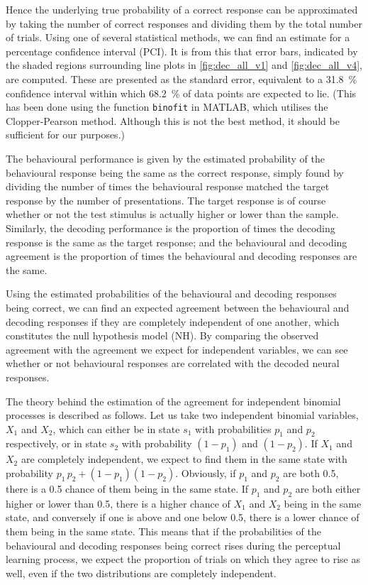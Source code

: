 Hence the underlying true probability of a correct response can be approximated by taking the number of correct responses and dividing them by the total number of trials.
Using one of several statistical methods, we can find an estimate for a percentage confidence interval (PCI).
It is from this that error bars, indicated by the shaded regions surrounding line plots in \autoref{fig:dec_all_v1} and \autoref{fig:dec_all_v4}, are computed.
These are presented as the standard error, equivalent to a \SI{31.8}{\percent}  confidence interval within which \SI{68.2}{\percent} of data points are expected to lie.
(This has been done using the function \texttt{binofit} in MATLAB, which utilises the Clopper-Pearson method.
Although this is not the best method, it should be sufficient for our purposes.)

The behavioural performance is given by the estimated probability of the behavioural response being the same as the correct response, simply found by dividing the number of times the behavioural response matched the target response by the number of presentations.
The target response is of course whether or not the test stimulus is actually higher or lower than the sample.
Similarly, the decoding performance is the proportion of times the decoding response is the same as the target response; and the behavioural and decoding agreement is the proportion of times the behavioural and decoding responses are the same.

Using the estimated probabilities of the behavioural and decoding responses being correct, we can find an expected agreement between the behavioural and decoding responses if they are completely independent of one another, which constitutes the null hypothesis model (NH).
By comparing the observed agreement with the agreement we expect for independent variables, we can see whether or not behavioural responses are correlated with the decoded neural responses.

The theory behind the estimation of the agreement for independent binomial processes is described as follows.
Let us take two independent binomial variables, $X_1$ and $X_2$, which can either be in state $s_1$ with probabilities $p_1$ and $p_2$ respectively, or in state $s_2$ with probability $(1-p_1)$ and $(1-p_2)$.
If $X_1$ and $X_2$ are completely independent, we expect to find them in the same state with probability $p_1 \, p_2 + (1-p_1) (1-p_2)$.
Obviously, if $p_1$ and $p_2$ are both 0.5, there is a 0.5 chance of them being in the same state.
If $p_1$ and $p_2$ are both either higher or lower than 0.5, there is a higher chance of $X_1$ and $X_2$ being in the same state, and conversely if one is above and one below 0.5, there is a lower chance of them being in the same state.
This means that if the probabilities of the behavioural and decoding responses being correct rises during the perceptual learning process, we expect the proportion of trials on which they agree to rise as well, even if the two distributions are completely independent.

